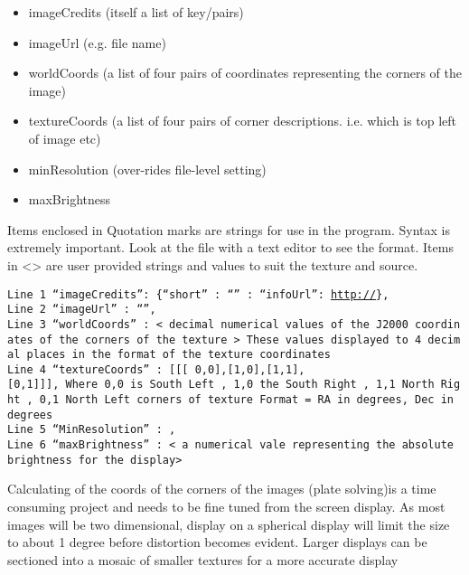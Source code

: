 \begin{itemize}
  \begin{itemize}
  \item
    imageCredits (itself a list of key/pairs)
  \item
    imageUrl (e.g. file name)
  \item
    worldCoords (a list of four pairs of coordinates representing the
    corners of the image)
  \item
    textureCoords (a list of four pairs of corner descriptions. i.e.
    which is top left of image etc)
  \item
    minResolution (over-rides file-level setting)
  \item
    maxBrightness
  \end{itemize}
\end{itemize}

Items enclosed in Quotation marks are strings for use in the program.
Syntax is extremely important. Look at the file with a text editor to
see the format. Items in \textless{}\textgreater{} are user provided
strings and values to suit the texture and source.

\texttt{Line~1~“imageCredits”:~\{“short”~:~“}\texttt{”~:~“infoUrl”:~}\href{http://}{\texttt{http://}}\texttt{\},~}\\
\texttt{Line~2~“imageUrl”~:~“}\texttt{”,~}\\
\texttt{Line~3~“worldCoords”~:~\textless{}~decimal~numerical~values~of~the~J2000~coordinates~of~the~corners~of~the~texture~\textgreater{}~These~values~displayed~to~4~decimal~places~in~the~format~of~the~texture~coordinates~}\\
\texttt{Line~4~“textureCoords”~:~{[}{[}{[}~0,0{]},{[}1,0{]},{[}1,1{]},{[}0,1{]}{]}{]},~Where~0,0~is~South~Left~,~1,0~the~South~Right~,~1,1~North~Right~,~0,1~North~Left~corners~of~texture~Format~=~RA~in~degrees,~Dec~in~degrees~}\\
\texttt{Line~5~“MinResolution”~:~}\texttt{,~}\\
\texttt{Line~6~“maxBrightness”~:~\textless{}~a~numerical~vale~representing~the~absolute~brightness~for~the~display\textgreater{}~}

Calculating of the coords of the corners of the images (plate solving)is
a time consuming project and needs to be fine tuned from the screen
display. As most images will be two dimensional, display on a spherical
display will limit the size to about 1 degree before distortion becomes
evident. Larger displays can be sectioned into a mosaic of smaller
textures for a more accurate display

